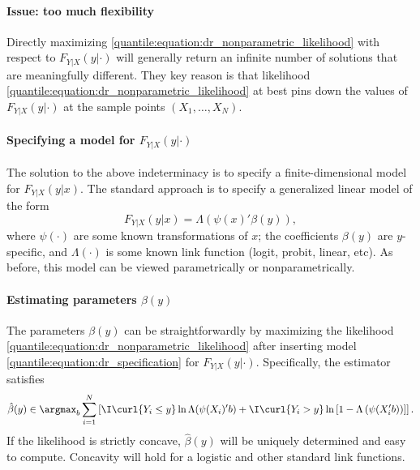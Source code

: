  \paragraph{Issue: too much flexibility}
 
 Directly maximizing \eqref{quantile:equation:dr_nonparametric_likelihood} with respect to $F_{Y|X}(y|\cdot)$ will generally return an infinite number of solutions that are meaningfully different. They key reason is that likelihood \eqref{quantile:equation:dr_nonparametric_likelihood} at best pins down the values of $F_{Y|X}(y|\cdot)$ at the sample points $(X_1, \dots, X_N)$.
 
 \paragraph{Specifying a model for $F_{Y|X}(y|\cdot)$}
 
 The solution to the above indeterminacy is to specify a finite-dimensional model for $F_{Y|X}(y|x)$. The standard approach is to specify a  generalized linear model of the form
 \begin{equation}\label{quantile:equation:dr_specification}
 	F_{Y|X}(y|x) = \Lambda(\psi(x)'\beta(y)),
 \end{equation}
 where $\psi(\cdot)$ are some known transformations of $x$; the coefficients $\beta(y)$ are $y$-specific, and $\Lambda(\cdot)$ is some known link function (logit, probit, linear, etc).  As before, this model can be viewed parametrically or nonparametrically.
 
 
 \paragraph{Estimating parameters $\beta(y)$}
 
 The parameters $\beta(y)$ can be straightforwardly by maximizing the likelihood \eqref{quantile:equation:dr_nonparametric_likelihood} after inserting model \eqref{quantile:equation:dr_specification} for $F_{Y|X}(y|\cdot)$. Specifically,  the estimator satisfies
  \begin{equation}
 	\hat{\beta}(y) \in \argmax_b \sum_{i=1}^{N}\left[ \I\curl{Y_{i}\leq y} \ln \Lambda(\psi(X_{i})'b) + \I\curl{Y_{i}>y}\ln\left[1-\Lambda\left(\psi(X_{i}'b) \right) \right] \right].
 \end{equation} 
 If the likelihood is strictly concave, $\hat{\beta}(y)$ will be uniquely determined and easy to compute. Concavity will hold for a logistic and other standard link functions.
 
